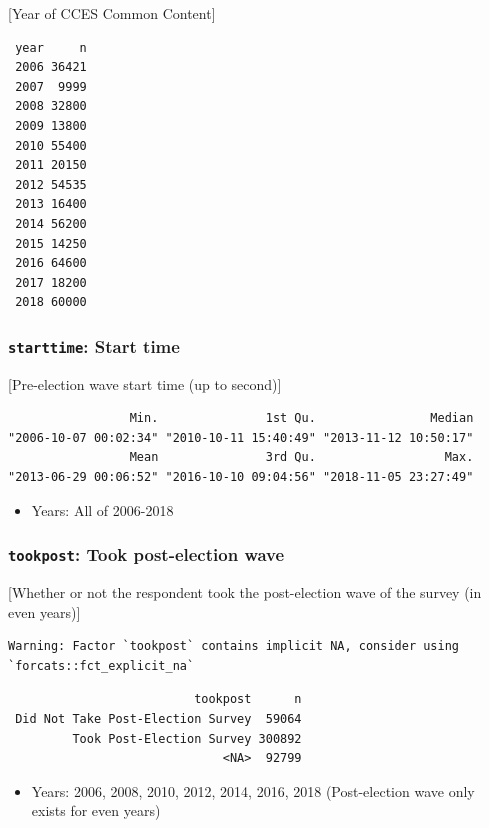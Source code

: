 \documentclass[10pt,article,oneside]{memoir}
\theoremstyle{definition}
\begin{document}
{[}Year of CCES Common Content{]}

\begin{verbatim}
 year     n
 2006 36421
 2007  9999
 2008 32800
 2009 13800
 2010 55400
 2011 20150
 2012 54535
 2013 16400
 2014 56200
 2015 14250
 2016 64600
 2017 18200
 2018 60000
\end{verbatim}

\hypertarget{starttime-start-time}{%
\subsubsection{\texorpdfstring{\texttt{starttime}: Start
time}{starttime: Start time}}\label{starttime-start-time}}

{[}Pre-election wave start time (up to second){]}

\begin{verbatim}
                 Min.               1st Qu.                Median 
"2006-10-07 00:02:34" "2010-10-11 15:40:49" "2013-11-12 10:50:17" 
                 Mean               3rd Qu.                  Max. 
"2013-06-29 00:06:52" "2016-10-10 09:04:56" "2018-11-05 23:27:49" 
\end{verbatim}

\begin{itemize}
\tightlist
\item
  Years: All of 2006-2018
\end{itemize}

\hypertarget{tookpost-took-post-election-wave}{%
\subsubsection{\texorpdfstring{\texttt{tookpost}: Took post-election
wave}{tookpost: Took post-election wave}}\label{tookpost-took-post-election-wave}}

{[}Whether or not the respondent took the post-election wave of the
survey (in even years){]}

\begin{verbatim}
Warning: Factor `tookpost` contains implicit NA, consider using
`forcats::fct_explicit_na`
\end{verbatim}

\begin{verbatim}
                          tookpost      n
 Did Not Take Post-Election Survey  59064
         Took Post-Election Survey 300892
                              <NA>  92799
\end{verbatim}

\begin{itemize}
\tightlist
\item
  Years: 2006, 2008, 2010, 2012, 2014, 2016, 2018 (Post-election wave
  only exists for even years)
\end{itemize}
\end{document}
